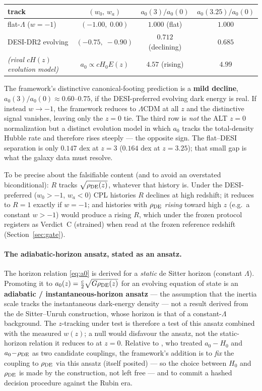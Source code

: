 \documentclass[11pt,a4paper]{article}
\newcommand{\rhoDE}{\rho_{\rm DE}}
\newcommand{\azero}{a_0}
\begin{document}
\begin{center}
\begin{tabular}{lccc}
\toprule
track & $(w_0,\,w_a)$ & $\azero(3)/\azero(0)$ & $\azero(3.25)/\azero(0)$\\
\midrule
flat-$\Lambda$ ($w=-1$) & $(-1.00,\;0.00)$ & $1.000$ (flat) & $1.000$\\
DESI-DR2 evolving & $(-0.75,\;-0.90)$ & $0.712$ (declining) & $0.685$\\
\emph{(rival $cH(z)$ evolution model)} & $\azero\propto cH_0E(z)$ & $4.57$ (rising) & $4.99$\\
\bottomrule
\end{tabular}
\end{center}

The framework's distinctive canonical-footing prediction is a \textbf{mild
decline}, $\azero(3)/\azero(0)\approx0.60$--$0.75$, if the DESI-preferred
evolving dark energy is real. If instead $w\to-1$, the framework reduces to
$\Lambda$CDM at all $z$ and the distinctive signal vanishes, leaving only the
$z=0$ tie. The third row is \emph{not} the ALT $z=0$ normalization but a
distinct evolution model in which $\azero$ tracks the total-density Hubble
rate and therefore rises steeply --- the opposite sign. The flat--DESI
separation is only $0.147$ dex at $z=3$ ($0.164$ dex at $z=3.25$); that small
gap is what the galaxy data must resolve.

To be precise about the falsifiable content (and to avoid an overstated
biconditional): $R$ tracks $\sqrt{\rhoDE(z)}$, whatever that history is.
Under the DESI-preferred ($w_0>-1$, $w_a<0$) CPL histories $R$ declines at
high redshift; it reduces to $R=1$ exactly if $w=-1$; and histories with
$\rhoDE$ \emph{rising} toward high $z$ (e.g.\ a constant $w>-1$) would produce
a rising $R$, which under the frozen protocol registers as Verdict~C
(strained) when read at the frozen reference redshift
(Section~\ref{sec:gate}).

\paragraph{The adiabatic-horizon ansatz, stated as an ansatz.} The horizon
relation \eqref{eq:a0} is derived for a \emph{static} de Sitter horizon
(constant $\Lambda$). Promoting it to
$\azero(z)=\tfrac{c}{2}\sqrt{G\rhoDE(z)}$ for an evolving equation of state is
an \textbf{adiabatic / instantaneous-horizon ansatz} --- the assumption that
the inertia scale tracks the instantaneous dark-energy density --- not a
result derived from the de Sitter--Unruh construction, whose horizon is that
of a constant-$\Lambda$ background. The $z$-tracking under test is therefore a
test of this ansatz combined with the measured $w(z)$; a null would disfavour
the ansatz, not the static-horizon relation it reduces to at $z=0$. Relative
to \cite{LPO2008}, who treated $\azero\!-\!H_0$ and $\azero\!-\!\rhoDE$ as two
candidate couplings, the framework's addition is to \emph{fix} the coupling to
$\rhoDE$ via this ansatz (itself posited) --- so the choice between $H_0$ and
$\rhoDE$ is made by the construction, not left free --- and to commit a hashed
decision procedure against the Rubin era.
\end{document}

